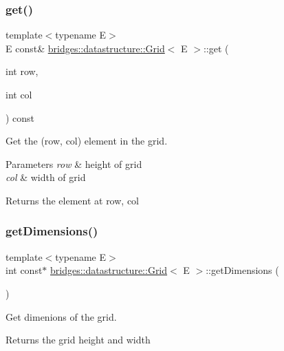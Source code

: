 \subsubsection{\texorpdfstring{get()}{get()}}
{\footnotesize\ttfamily template$<$typename E$>$ \\
E const\& \hyperlink{classbridges_1_1datastructure_1_1_grid}{bridges\+::datastructure\+::\+Grid}$<$ E $>$\+::get (\begin{DoxyParamCaption}\item[{int}]{row,  }\item[{int}]{col }\end{DoxyParamCaption}) const\hspace{0.3cm}{\ttfamily [inline]}}



Get the (row, col) element in the grid. 


\begin{DoxyParams}{Parameters}
{\em row} & height of grid \\
\hline
{\em col} & width of grid \\
\hline
\end{DoxyParams}
\begin{DoxyReturn}{Returns}
the element at row, col 
\end{DoxyReturn}
\mbox{\label{classbridges_1_1datastructure_1_1_grid_a5f1427f96782b3667585c06caef0b533}} 
\subsubsection{\texorpdfstring{get\+Dimensions()}{getDimensions()}}
{\footnotesize\ttfamily template$<$typename E$>$ \\
int const$\ast$ \hyperlink{classbridges_1_1datastructure_1_1_grid}{bridges\+::datastructure\+::\+Grid}$<$ E $>$\+::get\+Dimensions (\begin{DoxyParamCaption}{ }\end{DoxyParamCaption})\hspace{0.3cm}{\ttfamily [inline]}}



Get dimenions of the grid. 

\begin{DoxyReturn}{Returns}
the grid height and width 
\end{DoxyReturn}
\mbox{\label{classbridges_1_1datastructure_1_1_grid_a16aeae38446b96f440dea15f2b19334d}} 
